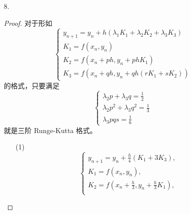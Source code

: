 \documentclass{sjtuarticle}
\def\DD{\mathrm{D}}
\begin{document}
\begin{itemize}
    \item[8.] \begin{proof}
        对于形如 \begin{equation*}
            \begin{cases}
                y_{n+1}=y_n+h(\lambda_1K_1+\lambda_2K_2+\lambda_3K_3)\\
                K_1=f(x_n,y_n)\\
                K_2=f(x_n+ph,y_n+phK_1)\\
                K_3=f(x_n+qh,y_n+qh(rK_1+sK_2))
            \end{cases}
        \end{equation*}
        的格式，只要满足
        \begin{equation}\label{eq:cond}
            \begin{cases}
                \lambda_2p+\lambda_3q=\frac{1}{2}\\
                \lambda_2p^2+\lambda_3q^2=\frac{1}{3}\\
                \lambda_3pqs=\frac{1}{6}
            \end{cases}
        \end{equation}
        就是三阶 Runge-Kutta 格式。
        \begin{itemize}
            \item[(1)] \begin{equation*}
                \begin{cases}
                    y_{n+1}=y_n+\frac{h}{4}(K_1+3K_3),\\
                    K_1=f(x_n,y_n),\\
                    K_2=f\left(x_n+\frac{h}{3},y_n+\frac{h}{3}K_1\right),\\

\end{cases}
\end{equation*}
\end{itemize}
\end{proof}
\end{itemize}
\end{document}
